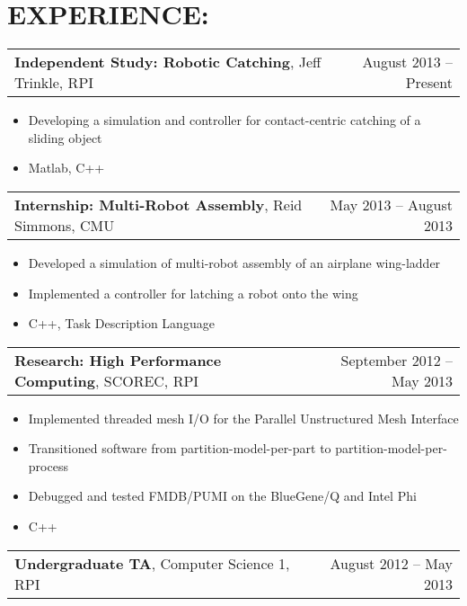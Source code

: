 \documentclass[margin]{res}
\begin{document}
\begin{resume}
\begin{ncolumn}{2}
	\end{ncolumn}
\vspace{-5mm}
 \section{EXPERIENCE:}      
	\begin{tabular}{p{4in} r}
    {\bf Independent Study: Robotic Catching}, Jeff Trinkle, RPI & August 2013 -- Present
  \end{tabular}
  \begin{itemize}
    \item Developing a simulation and controller for contact-centric catching of a sliding object
    \item Matlab, C++
  \end{itemize}
	\vspace{-1.5mm}
	\begin{tabular}{p{4in} r}
    {\bf Internship: Multi-Robot Assembly}, Reid Simmons, CMU & May 2013 -- August 2013
  \end{tabular}
  \begin{itemize}
    \item Developed a simulation of multi-robot assembly of an airplane wing-ladder
    \item Implemented a controller for latching a robot onto the wing 
    \item C++, Task Description Language
  \end{itemize}
	\vspace{-1.5mm}
	\begin{tabular}{p{4in} r}
		{\bf Research: High Performance Computing}, SCOREC, RPI	& September 2012 -- May 2013\\
	\end{tabular}
	\begin{itemize}
		\item Implemented threaded mesh I/O for the Parallel Unstructured Mesh Interface
    \item Transitioned software from partition-model-per-part to partition-model-per-process
		\item Debugged and tested FMDB/PUMI on the BlueGene/Q and Intel Phi
    \item C++
	\end{itemize}
	\vspace{-1.5mm}
	\begin{tabular}{p{4in} r}
	  {\bf Undergraduate TA}, Computer Science 1, RPI 			& August 2012 -- May 2013\\

\end{tabular}
\end{resume}
\end{document}
